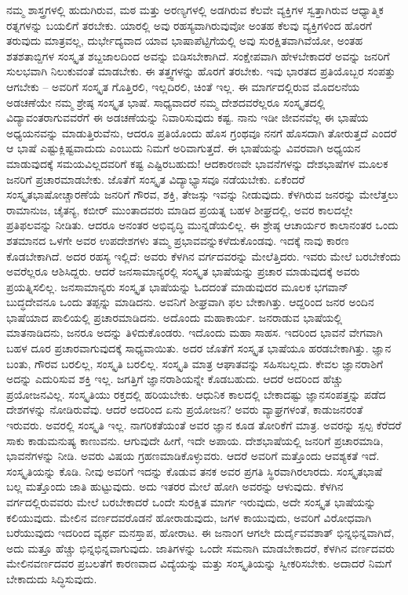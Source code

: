 ನಮ್ಮ ಶಾಸ್ತ್ರಗಳಲ್ಲಿ ಹುದುಗಿರುವ, ಮಠ ಮತ್ತು ಅರಣ್ಯಗಳಲ್ಲಿ ಅಡಗಿರುವ ಕೆಲವೇ ವ್ಯಕ್ತಿಗಳ ಸ್ವತ್ತಾಗಿರುವ ಆಧ್ಯಾತ್ಮಿಕ ರತ್ನಗಳನ್ನು ಬಯಲಿಗೆ ತರಬೇಕು. ಯಾರಲ್ಲಿ ಅವು ರಹಸ್ಯವಾಗಿರುವುವೋ ಅಂತಹ ಕೆಲವು ವ್ಯಕ್ತಿಗಳಿಂದ ಹೊರಗೆ ತರುವುದು ಮಾತ್ರವಲ್ಲ, ದುರ್ಭೇದ್ಯವಾದ ಯಾವ ಭಾಷಾಪೆಟ್ಟಿಗೆಯಲ್ಲಿ ಅವು ಸುರಕ್ಷಿತವಾಗಿವೆಯೋ, ಅಂತಹ ಶತಶತಾಬ್ದಿಗಳ ಸಂಸ್ಕೃತ ಶಬ್ದಜಾಲದಿಂದ ಅವನ್ನು ಬಿಡಿಸಬೇಕಾಗಿದೆ. ಸಂಕ್ಷೇಪವಾಗಿ ಹೇಳಬೇಕಾದರೆ ಅವನ್ನು ಜನರಿಗೆ ಸುಲಭವಾಗಿ ನಿಲುಕುವಂತೆ ಮಾಡಬೇಕು. ಈ ತತ್ತ್ವಗಳನ್ನು ಹೊರಗೆ ತರಬೇಕು. ಇವು ಭಾರತದ ಪ್ರತಿಯೊಬ್ಬರ ಸಂಪತ್ತು ಆಗಬೇಕು – ಅವರಿಗೆ ಸಂಸ್ಕೃತ ಗೊತ್ತಿರಲಿ, ಇಲ್ಲದಿರಲಿ, ಚಿಂತೆ ಇಲ್ಲ. ಈ ಮಾರ್ಗದಲ್ಲಿರುವ ಮೊದಲನೆಯ ಅಡಚಣೆಯೇ ನಮ್ಮ ಶ್ರೇಷ್ಠ ಸಂಸ್ಕೃತ ಭಾಷೆ. ಸಾಧ್ಯವಾದರೆ ನಮ್ಮ ದೇಶದವರೆಲ್ಲರೂ ಸಂಸ್ಕೃತದಲ್ಲಿ ವಿದ್ಯಾವಂತರಾಗುವವರೆಗೆ ಈ ಅಡಚಣೆಯನ್ನು ನಿವಾರಿಸುವುದು ಕಷ್ಟ. ನಾನು ಇಡೀ ಜೀವನವೆಲ್ಲ ಈ ಭಾಷೆಯ ಅಧ್ಯಯನವನ್ನು ಮಾಡುತ್ತಿರುವೆನು, ಆದರೂ ಪ್ರತಿಯೊಂದು ಹೊಸ ಗ್ರಂಥವೂ ನನಗೆ ಹೊಸದಾಗಿ ತೋರುತ್ತದೆ ಎಂದರೆ ಆ ಭಾಷೆ ಎಷ್ಟುಕ್ಲಿಷ್ಟವಾದುದು ಎಂಬುದು ನಿಮಗೆ ಅರಿವಾಗುತ್ತದೆ. ಈ ಭಾಷೆಯನ್ನು ವಿವರವಾಗಿ ಅಧ್ಯಯನ ಮಾಡುವುದಕ್ಕೆ ಸಮಯವಿಲ್ಲದವರಿಗೆ ಕಷ್ಟ ಎಷ್ಟಿರಬಹುದು! ಆದಕಾರಣವೇ ಭಾವನೆಗಳನ್ನು ದೇಶಭಾಷೆಗಳ ಮೂಲಕ ಜನರಿಗೆ ಪ್ರಚಾರಮಾಡಬೇಕು. ಜೊತೆಗೆ ಸಂಸ್ಕೃತ ವಿದ್ಯಾಭ್ಯಾಸವೂ ನಡೆಯಬೇಕು. ಏಕೆಂದರೆ ಸಂಸ್ಕೃತಭಾಷೋಚ್ಚಾರಣೆಯೆ ಜನರಿಗೆ ಗೌರವ, ಶಕ್ತಿ, ತೇಜಸ್ಸು ಇವನ್ನು ನೀಡುವುದು. ಕೆಳಗಿರುವ ಜನರನ್ನು ಮೇಲೆತ್ತಲು ರಾಮಾನುಜ, ಚೈತನ್ಯ, ಕಬೀರ್​ ಮುಂತಾದವರು ಮಾಡಿದ ಪ್ರಯತ್ನ ಬಹಳ ಶೀಘ್ರದಲ್ಲಿ, ಅವರ ಕಾಲದಲ್ಲೇ ಪ್ರತಿಫಲವನ್ನು ನೀಡಿತು. ಆದರೂ ಅನಂತರ ಅಭಿವೃದ್ಧಿ ಮುನ್ನಡೆಯಲಿಲ್ಲ. ಈ ಶ್ರೇಷ್ಠ ಆಚಾರ್ಯರ ಕಾಲಾನಂತರ ಒಂದು ಶತಮಾನದ ಒಳಗೇ ಅವರ ಉಪದೇಶಗಳು ತಮ್ಮ ಪ್ರಭಾವವನ್ನುಕಳೆದುಕೊಂಡವು. ಇದಕ್ಕೆ ನಾವು ಕಾರಣ ಕೊಡಬೇಕಾಗಿದೆ. ಅದರ ರಹಸ್ಯ ಇಲ್ಲಿದೆ: ಅವರು ಕೆಳಗಿನ ವರ್ಗದವರನ್ನು ಮೇಲೆತ್ತಿದರು. ಇವರು ಮೇಲೆ ಬರಬೇಕೆಂದು ಅವರೆಲ್ಲರೂ ಆಶಿಸಿದ್ದರು. ಆದರೆ ಜನಸಾಮಾನ್ಯರಲ್ಲಿ ಸಂಸ್ಕೃತ ಭಾಷೆಯನ್ನು ಪ್ರಚಾರ ಮಾಡುವುದಕ್ಕೆ ಅವರು ಪ್ರಯತ್ನಿಸಲಿಲ್ಲ. ಜನಸಾಮಾನ್ಯರು ಸಂಸ್ಕೃತ ಭಾಷೆಯನ್ನು ಓದದಂತೆ ಮಾಡುವುದರ ಮೂಲಕ ಭಗವಾನ್​ ಬುದ್ಧದೇವನೂ ಒಂದು ತಪ್ಪನ್ನು ಮಾಡಿದನು. ಅವನಿಗೆ ಶೀಘ್ರವಾಗಿ ಫಲ ಬೇಕಾಗಿತ್ತು. ಆದ್ದರಿಂದ ಜನರ ಅಂದಿನ ಭಾಷೆಯಾದ ಪಾಲಿಯಲ್ಲಿ ಪ್ರಚಾರಮಾಡಿದನು. ಅದೊಂದು ಮಹಾಕಾರ್ಯ. ಜನರಾಡುವ ಭಾಷೆಯಲ್ಲಿ ಮಾತನಾಡಿದನು, ಜನರೂ ಅದನ್ನು ತಿಳಿದುಕೊಂಡರು. ಇದೊಂದು ಮಹಾ ಸಾಹಸ. ಇದರಿಂದ ಭಾವನೆ ವೇಗವಾಗಿ ಬಹಳ ದೂರ ಪ್ರಚಾರವಾಗುವುದಕ್ಕೆ ಸಾಧ್ಯವಾಯಿತು. ಅದರ ಜೊತೆಗೆ ಸಂಸ್ಕೃತ ಭಾಷೆಯೂ ಹರಡಬೇಕಾಗಿತ್ತು. ಜ್ಞಾನ ಬಂತು, ಗೌರವ ಬರಲಿಲ್ಲ, ಸಂಸ್ಕೃತಿ ಬರಲಿಲ್ಲ. ಸಂಸ್ಕೃತಿ ಮಾತ್ರ ಆಘಾತವನ್ನು ಸಹಿಸಬಲ್ಲದು. ಕೇವಲ ಜ್ಞಾನರಾಶಿಗೆ ಅದನ್ನು ಎದುರಿಸುವ ಶಕ್ತಿ ಇಲ್ಲ. ಜಗತ್ತಿಗೆ ಜ್ಞಾನರಾಶಿಯನ್ನೇ ಕೊಡಬಹುದು. ಆದರೆ ಅದರಿಂದ ಹೆಚ್ಚು ಪ್ರಯೋಜನವಿಲ್ಲ. ಸಂಸ್ಕೃತಿಯು ರಕ್ತದಲ್ಲಿ ಹರಿಯಬೇಕು. ಆಧುನಿಕ ಕಾಲದಲ್ಲಿ ಬೇಕಾದಷ್ಟು ಜ್ಞಾನಸಂಪತ್ತನ್ನು ಪಡೆದ ದೇಶಗಳನ್ನು ನೋಡಿರುವೆವು. ಆದರೆ ಅದರಿಂದ ಏನು ಪ್ರಯೋಜನ? ಅವರು ವ್ಯಾಘ್ರಗಳಂತೆ, ಕಾಡುಜನರಂತೆ ಇರುವರು. ಅವರಲ್ಲಿ ಸಂಸ್ಕೃತಿ ಇಲ್ಲ. ನಾಗರಿಕತೆಯಂತೆ ಅವರ ಜ್ಞಾನ ಕೂಡ ತೋರಿಕೆಗೆ ಮಾತ್ರ. ಅವರನ್ನು ಸ್ಪಲ್ಪ ಕೆರೆದರೆ ಸಾಕು ಕಾಡುಮನುಷ್ಯ ಕಾಣುವನು. ಆಗುವುದೇ ಹೀಗೆ, ಇದೇ ಅಪಾಯ. ದೇಶಭಾಷೆಯಲ್ಲಿ ಜನರಿಗೆ ಪ್ರಚಾರಮಾಡಿ, ಭಾವನೆಗಳನ್ನು ನೀಡಿ. ಅವರು ವಿಷಯ ಗ್ರಹಣಮಾಡಿಕೊಳ್ಳುವರು. ಆದರೆ ಅವರಿಗೆ ಮತ್ತೊಂದು ಆವಶ್ಯಕತೆ ಇದೆ. ಸಂಸ್ಕೃತಿಯನ್ನು ಕೊಡಿ. ನೀವು ಅವರಿಗೆ ಇದನ್ನು ಕೊಡುವ ತನಕ ಅವರ ಪ್ರಗತಿ ಸ್ಥಿರವಾಗಿರಲಾರದು. ಸಂಸ್ಕೃತಭಾಷೆ ಬಲ್ಲ ಮತ್ತೊಂದು ಜಾತಿ ಹುಟ್ಟುವುದು. ಅದು ಇತರರ ಮೇಲೆ ಹೋಗಿ ಅವರನ್ನು ಆಳುವುದು. ಕೆಳಗಿನ ವರ್ಗದಲ್ಲಿರುವವರು ಮೇಲೆ ಬರಬೇಕಾದರೆ ಒಂದೇ ಸುರಕ್ಷಿತ ಮಾರ್ಗ ಇರುವುದು, ಅದೇ ಸಂಸ್ಕೃತ ಭಾಷೆಯನ್ನು ಕಲಿಯುವುದು. ಮೇಲಿನ ವರ್ಣದವರೊಡನೆ ಹೋರಾಡುವುದು, ಜಗಳ ಕಾಯುವುದು, ಅವರಿಗೆ ವಿರೋಧವಾಗಿ ಬರೆಯುವುದು ಇದರಿಂದ ವ್ಯರ್ಥ ಮನಸ್ತಾಪ, ಹೋರಾಟ. ಈ ಜನಾಂಗ ಆಗಲೇ ದುರ್ದೈವವಶಾತ್​ ಭಿನ್ನಭಿನ್ನವಾಗಿದೆ, ಅದು ಮತ್ತೂ ಹೆಚ್ಚು ಭಿನ್ನಭಿನ್ನವಾಗುವುದು. ಜಾತಿಗಳನ್ನು ಒಂದೇ ಸಮನಾಗಿ ಮಾಡಬೇಕಾದರೆ, ಕೆಳಗಿನ ವರ್ಣದವರು ಮೇಲಿನವರ್ಣದವರ ಪ್ರಬಲತೆಗೆ ಕಾರಣವಾದ ವಿದ್ಯೆಯನ್ನು ಮತ್ತು ಸಂಸ್ಕೃತಿಯನ್ನು ಸ್ವೀಕರಿಸಬೇಕು. ಅದಾದರೆ ನಿಮಗೆ ಬೇಕಾದುದು ಸಿದ್ಧಿಸುವುದು. 

